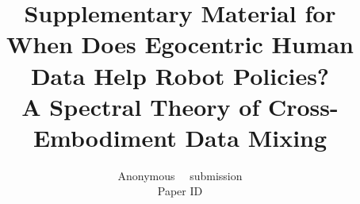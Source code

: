 \documentclass[10pt,twocolumn,letterpaper]{article}
\title{Supplementary Material for\\
When Does Egocentric Human Data Help Robot Policies?\\
A Spectral Theory of Cross-Embodiment Data Mixing}
\author{Anonymous \confName~\confYear~submission\\
Paper ID \paperID
}
\begin{document}
\maketitle
\appendix

{
    \small
    
    
}
\end{document}
